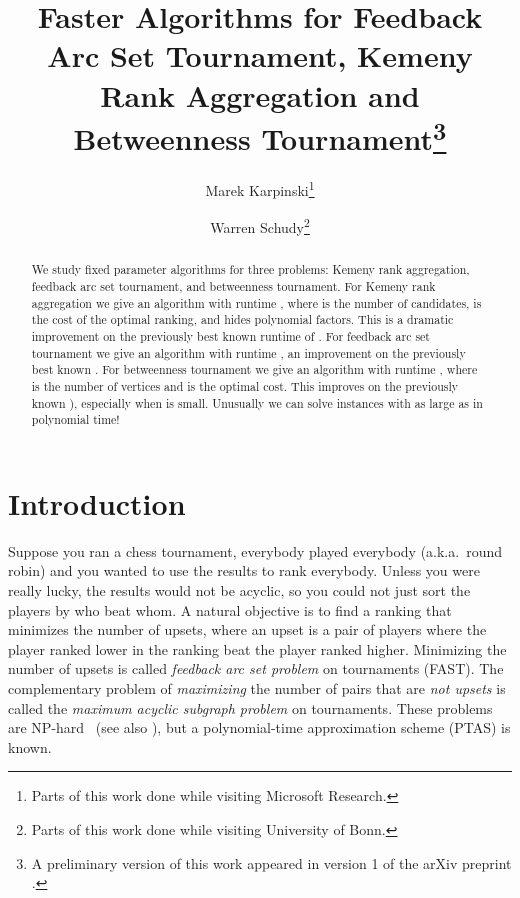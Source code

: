 \documentclass[envcountsame,oribibl]{llncs}
\newcommand{\fast}{\textsc{FAST}}
\begin{document}
\title{Faster Algorithms for Feedback Arc Set Tournament, Kemeny Rank Aggregation and Betweenness Tournament\thanks{A preliminary version of this work appeared in version 1 of the arXiv preprint \cite{Karpinski09betweenness}.}}
  \author{Marek Karpinski\thanks{Parts of this work done while visiting Microsoft Research.} \and Warren Schudy\thanks{Parts of this work done while visiting University of Bonn.}}
 

\maketitle              

\begin{abstract}
We study fixed parameter algorithms for three problems: Kemeny rank aggregation, feedback arc set tournament, and betweenness tournament. For Kemeny rank aggregation we give an algorithm with runtime , where  is the number of candidates,  is the cost of the optimal ranking, and  hides polynomial factors. This is a dramatic improvement on the previously best known runtime of . For feedback arc set tournament we give an algorithm with runtime , an improvement on the previously best known  \cite{Alon09}. For betweenness tournament we give an algorithm with runtime , where  is the number of vertices and  is the optimal cost. This improves on the previously known  \cite{Saurabh09}), especially when  is small. Unusually we can solve instances with  as large as  in polynomial time!

\end{abstract}

\section{Introduction}

Suppose you ran a chess tournament, everybody played everybody (a.k.a.\ round robin) and you wanted to use the results to rank everybody.  Unless you were really lucky, the results would not be acyclic, so you could not just sort the players by who beat whom. A natural objective is to find a ranking that minimizes the number of upsets, where an upset is a pair of players where the player ranked lower in the ranking beat the player ranked higher. Minimizing the number of upsets is called \emph{feedback arc set problem} on tournaments (\fast). The complementary problem of \emph{maximizing} the number of pairs that are \emph{not upsets} is called the \emph{maximum acyclic subgraph problem} on tournaments. These problems are NP-hard~\citep{Ailon08aggregating,Alon06,Charbit07} (see also \citep{Conitzer06a}), but a polynomial-time approximation scheme (PTAS) \cite{Mathieu09fast} is known.
\end{document}
